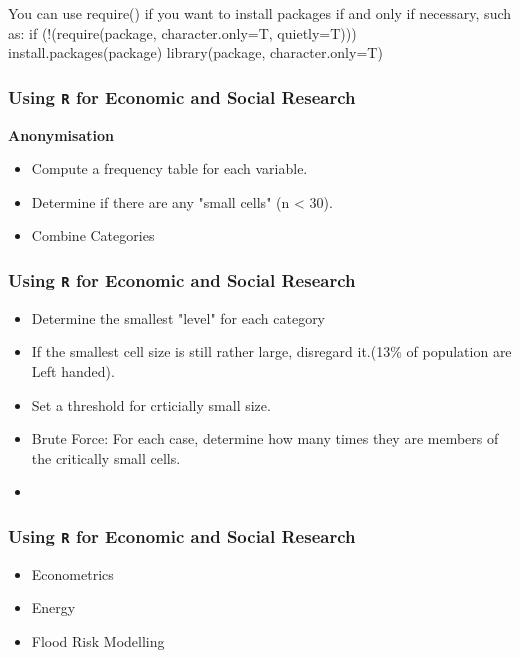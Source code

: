 \documentclass{beamer}
\begin{document}
\begin{frame}[fragile]

You can use require() if you want to install packages if and only if necessary, such as:
if (!(require(package, character.only=T, quietly=T))) {
    install.packages(package)
    library(package, character.only=T)
}



\begin{frame}[fragile]
\frametitle{Using \texttt{R} for Economic and Social Research}

\textbf{Anonymisation}

\begin{itemize}
\item Compute a frequency table for each variable.
\item Determine if there are any "small cells" (n < 30).
\item Combine Categories
\end{itemize}

\end{frame}
\begin{frame}[fragile]
\frametitle{Using \texttt{R} for Economic and Social Research}


\begin{itemize}
\item Determine the smallest "level" for each category
\item If the smallest cell size is still rather large, disregard it.(13\% of population are Left handed). 
\item Set a threshold for crticially small size.
\item Brute Force: For each case, determine how many times they are members of the critically small cells.
\item
\end{itemize}

\begin{frame}[fragile]
\frametitle{Using \texttt{R} for Economic and Social Research}

\begin{frame}

\begin{itemize}
\item Econometrics
\item Energy
\item Flood Risk Modelling
\end{itemize}


\end{frame}
\end{frame}
\end{frame}
\end{frame}
\end{document}
